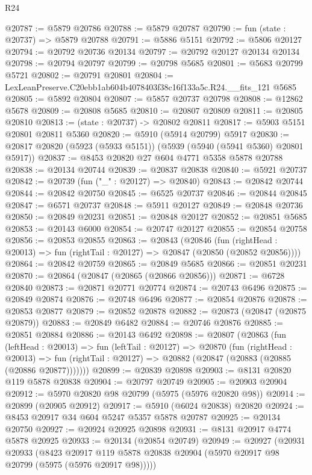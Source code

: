 \begin{lexlean}{R24}
\begin{coremodule}
@20787 := @5879 @20786
@20788 := @5879 @20787
@20790 := fun (state : @20737) => @5879 @20788
@20791 := @5886 @5151
@20792 := @5806 @20127
@20794 := @20792 @20736 @20134
@20797 := @20792 @20127 @20134 @20134
@20798 := @20794 @20797
@20799 := @20798 @5685
@20801 := @5683 @20799 @5721
@20802 := @20791 @20801
@20804 := LexLeanPreserve.C20ebb1ab604b4078403f38c16f133a5c.R24.__fits_121 @5685
@20805 := @5892 @20804
@20807 := @5857 @20737 @20798
@20808 := @12862 @5678
@20809 := @20808 @5685
@20810 := @20807 @20809
@20811 := @20805 @20810
@20813 := (state : @20737) -> @20802 @20811
@20817 := @5903 @5151 @20801 @20811 @5360
@20820 := @5910 (@5914 @20799) @5917
@20830 := @20817 @20820 (@5923 (@5933 @5151)) (@5939 (@5940 (@5941 @5360) @20801 @5917))
@20837 := @8453 @20820 @27 @604 @4771 @5358 @5878 @20788
@20838 := @20134 @20744
@20839 := @20837 @20838
@20840 := @5921 @20737
@20842 := @20739 (fun ("_" : @20127) => @20840)
@20843 := @20842 @20744
@20844 := @20842 @20750
@20845 := @6525 @20737
@20846 := @20844 @20845
@20847 := @6571 @20737
@20848 := @5911 @20127
@20849 := @20848 @20736
@20850 := @20849 @20231
@20851 := @20848 @20127
@20852 := @20851 @5685
@20853 := @20143 @6000
@20854 := @20747 @20127
@20855 := @20854 @20758
@20856 := @20853 @20855
@20863 := @20843
    (@20846
      (fun (rightHead : @20013) => fun (rightTail : @20127) => @20847 (@20850 (@20852 @20856))))
@20864 := @20842 @20759
@20865 := @20849 @5685
@20866 := @20851 @20231
@20870 := @20864 (@20847 (@20865 (@20866 @20856)))
@20871 := @6728 @20840
@20873 := @20871 @20771 @20774
@20874 := @20743 @6496
@20875 := @20849 @20874
@20876 := @20748 @6496
@20877 := @20854 @20876
@20878 := @20853 @20877
@20879 := @20852 @20878
@20882 := @20873 (@20847 (@20875 @20879))
@20883 := @20849 @6482
@20884 := @20746 @20876
@20885 := @20851 @20884
@20886 := @20143 @6492
@20898 := @20807
    (@20863
      (fun (leftHead : @20013) =>
      fun (leftTail : @20127) =>
      @20870
        (fun (rightHead : @20013) =>
        fun (rightTail : @20127) => @20882 (@20847 (@20883 (@20885 (@20886 @20877)))))))
@20899 := @20839 @20898
@20903 := @8131 @20820 @119 @5878 @20838
@20904 := @20797 @20749
@20905 := @20903 @20904
@20912 := @5970 @20820 @98 @20799 (@5975 (@5976 @20820 @98))
@20914 := @20899 (@20905 @20912)
@20917 := @5910 (@6024 @20838) @20820
@20924 := @8453 @20917 @34 @604 @5247 @5357 @5878 @20787
@20925 := @20134 @20750
@20927 := @20924 @20925 @20898
@20931 := @8131 @20917 @4774 @5878 @20925
@20933 := @20134 (@20854 @20749)
@20949 := @20927
    (@20931
      @20933
      (@8423 @20917 @119 @5878 @20838 @20904 (@5970 @20917 @98 @20799 (@5975 (@5976 @20917 @98)))))

\end{coremodule}
\end{lexlean}
